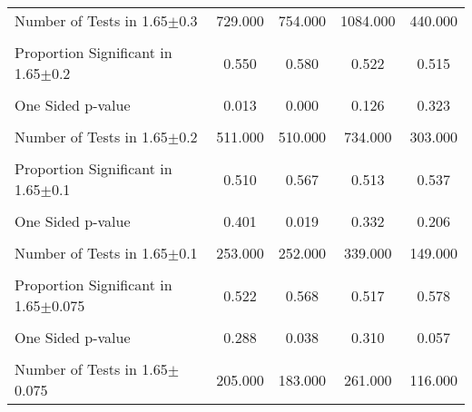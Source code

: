 {\begin{tabular}{l*{4}{c}}
Number of Tests in 1.65$\pm$0.3&  729.000         &  754.000         & 1084.000         &  440.000         \\
                &                  &                  &                  &                  \\
\hline Proportion Significant in 1.65$\pm$0.2&    0.550         &    0.580         &    0.522         &    0.515         \\
                &                  &                  &                  &                  \\
One Sided p-value&    0.013         &    0.000         &    0.126         &    0.323         \\
                &                  &                  &                  &                  \\
Number of Tests in 1.65$\pm$0.2&  511.000         &  510.000         &  734.000         &  303.000         \\
                &                  &                  &                  &                  \\
\hline Proportion Significant in 1.65$\pm$0.1&    0.510         &    0.567         &    0.513         &    0.537         \\
                &                  &                  &                  &                  \\
One Sided p-value&    0.401         &    0.019         &    0.332         &    0.206         \\
                &                  &                  &                  &                  \\
Number of Tests in 1.65$\pm$0.1&  253.000         &  252.000         &  339.000         &  149.000         \\
                &                  &                  &                  &                  \\
\hline Proportion Significant in 1.65$\pm$0.075&    0.522         &    0.568         &    0.517         &    0.578         \\
                &                  &                  &                  &                  \\
One Sided p-value&    0.288         &    0.038         &    0.310         &    0.057         \\
                &                  &                  &                  &                  \\
Number of Tests in 1.65$\pm$0.075&  205.000         &  183.000         &  261.000         &  116.000         \\

\end{tabular}}
